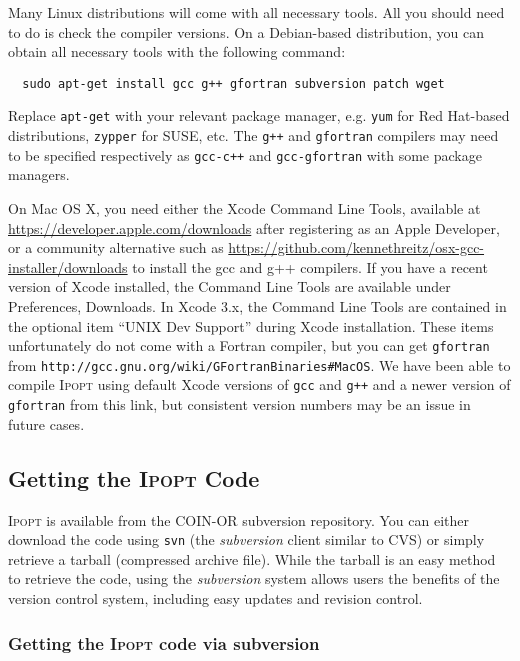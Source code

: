 \documentclass[10pt]{article}
\newcommand{\Ipopt}{\textsc{Ipopt}\xspace}
\begin{document}
Many Linux distributions will come with all necessary tools. All you should need to do is check the compiler versions. On a Debian-based distribution, you can obtain all necessary tools with the following command:
\begin{verbatim}
  sudo apt-get install gcc g++ gfortran subversion patch wget
\end{verbatim}
Replace {\tt apt-get} with your relevant package manager, e.g. {\tt yum} for Red Hat-based distributions, {\tt zypper} for SUSE, etc. The {\tt g++} and {\tt gfortran} compilers may need to be specified respectively as {\tt gcc-c++} and {\tt gcc-gfortran} with some package managers.

On Mac OS X, you need either the Xcode Command Line Tools, available at \url{https://developer.apple.com/downloads} after registering as an Apple Developer, or a community alternative such as \url{https://github.com/kennethreitz/osx-gcc-installer/downloads} to install the gcc and g++ compilers.
If you have a recent version of Xcode installed, the Command Line Tools are available under Preferences, Downloads. In Xcode 3.x, the Command Line Tools are contained in the optional item ``UNIX Dev Support'' during Xcode installation.
These items unfortunately do not come with a Fortran compiler, but you can get {\tt gfortran} from {\tt http://gcc.gnu.org/wiki/GFortranBinaries\#MacOS}. We have been able to compile \Ipopt using default Xcode versions of {\tt gcc} and {\tt g++} and a newer version of {\tt gfortran} from this link, but consistent version numbers may be an issue in future cases.

\subsection{Getting the \Ipopt Code}
\Ipopt is available from the COIN-OR subversion repository. You can
either download the code using \texttt{svn} (the
\textit{subversion} client similar to CVS) or
simply retrieve a tarball (compressed archive file).  While the
tarball is an easy method to retrieve the code, using the
\textit{subversion} system allows users the benefits of the version
control system, including easy updates and revision control.

\subsubsection{Getting the \Ipopt code via subversion}
\end{document}
